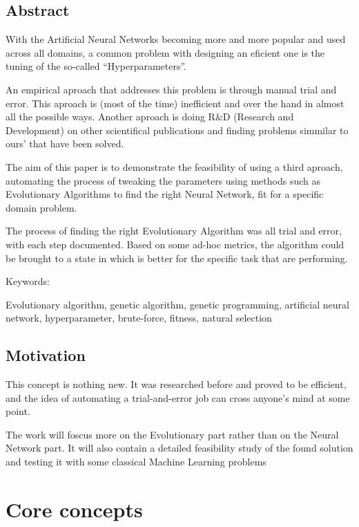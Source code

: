 \documentclass[11pt]{article}
\begin{document}
    \hypertarget{abstract}{%
\subsection{Abstract}\label{abstract}}

With the Artificial Neural Networks becoming more and more popular and
used across all domains, a common problem with designing an eficient one
is the tuning of the so-called ``Hyperparameters''.

An empirical aproach that addresses this problem is through manual trial
and error. This aproach is (most of the time) inefficient and over the
hand in almost all the possible ways. Another aproach is doing R\&D
(Research and Development) on other scientifical publications and
finding problems simmilar to ours' that have been solved.

The aim of this paper is to demonstrate the feasibility of using a third
aproach, automating the process of tweaking the parameters using methods
such as Evolutionary Algorithms to find the right Neural Network, fit
for a specific domain problem.

The process of finding the right Evolutionary Algorithm was all trial
and error, with each step documented. Based on some ad-hoc metrics, the
algorithm could be brought to a state in which is better for the
specific task that are performing.

Keywords:

Evolutionary algorithm, genetic algorithm, genetic programming,
artificial neural network, hyperparameter, brute-force, fitness, natural
selection

    \hypertarget{motivation}{%
\subsection{Motivation}\label{motivation}}

    This concept is nothing new. It was researched before and proved to be
efficient, and the idea of automating a trial-and-error job can cross
anyone's mind at some point.

The work will foscus more on the Evolutionary part rather than on the
Neural Network part. It will also contain a detailed feasibility study
of the found solution and testing it with some classical Machine
Learning problems

    \hypertarget{core-concepts}{%
\section{Core concepts}\label{core-concepts}}
\end{document}
